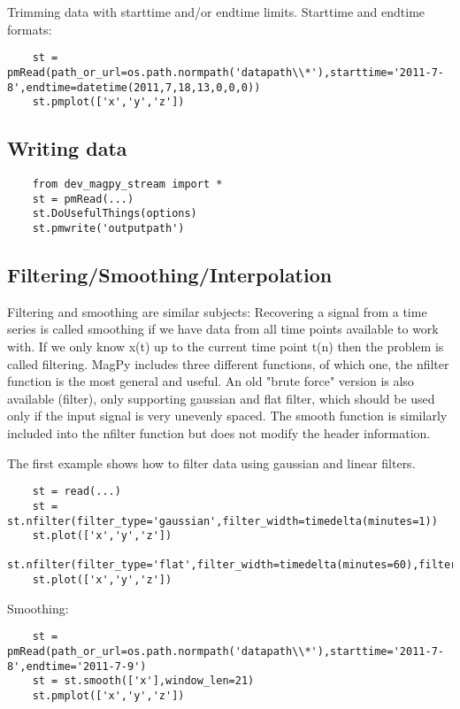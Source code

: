 Trimming data with starttime and/or endtime limits. Starttime and endtime formats:
\begin{verbatim}
    st = pmRead(path_or_url=os.path.normpath('datapath\\*'),starttime='2011-7-8',endtime=datetime(2011,7,18,13,0,0,0))
    st.pmplot(['x','y','z'])
\end{verbatim}

\subsection{Writing data}

\begin{verbatim}
    from dev_magpy_stream import *
    st = pmRead(...)
    st.DoUsefulThings(options)
    st.pmwrite('outputpath')
\end{verbatim}

\subsection{Filtering/Smoothing/Interpolation}

Filtering and smoothing are similar subjects: Recovering a signal from a time series is called smoothing if we have data from all time points available to work with. If we only know x(t) up to the current time point t(n) then the problem is called filtering. MagPy includes three different functions, of which one, the nfilter function is the most general and useful. An old "brute force" version is also available (filter), only supporting gaussian and flat filter, which should be used only if the input signal is very unevenly spaced. The smooth function is similarly included into the nfilter function but does not modify the header information.
   
The first example shows how to filter data using gaussian and linear filters.
\begin{verbatim}
    st = read(...)
    st = st.nfilter(filter_type='gaussian',filter_width=timedelta(minutes=1))
    st.plot(['x','y','z'])
    st.nfilter(filter_type='flat',filter_width=timedelta(minutes=60),filter_offset=timedelta(minutes=30))
    st.plot(['x','y','z'])
\end{verbatim}

Smoothing:
\begin{verbatim}
    st = pmRead(path_or_url=os.path.normpath('datapath\\*'),starttime='2011-7-8',endtime='2011-7-9')
    st = st.smooth(['x'],window_len=21)
    st.pmplot(['x','y','z'])
\end{verbatim}


